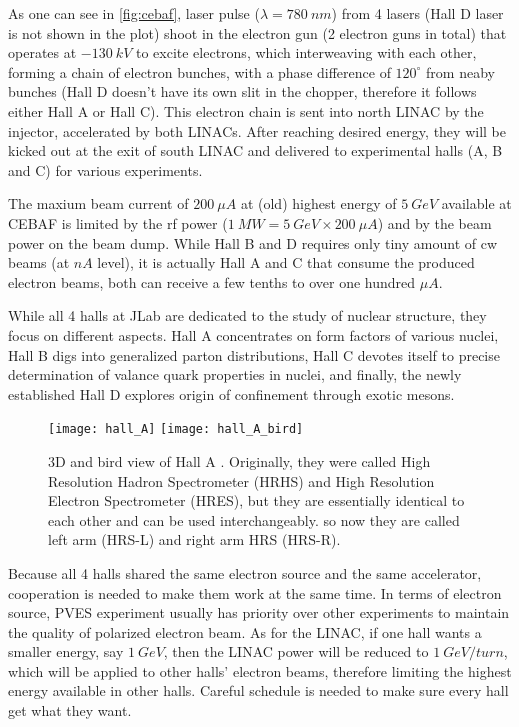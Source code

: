 As one can see in \ref{fig:cebaf}, laser pulse ($\lambda = 780 \ nm$) from 4 lasers 
(Hall D laser is not shown in the plot) shoot in the electron gun 
(2 electron guns in total) that 
operates at $-130\ kV$ to excite electrons, which interweaving with each other, 
forming a chain of electron bunches, with a phase difference of $120^\circ$ from 
neaby bunches (Hall D doesn't have its own slit in the chopper, therefore 
it follows either Hall A or Hall C). This electron chain is sent into north LINAC
by the injector, accelerated by both LINACs. After reaching desired energy,
they will be kicked out at the exit of south LINAC and delivered to experimental
halls (A, B and C) for various experiments. 

The maxium beam current of $200\ \mu A$ at (old) highest energy of $5\ GeV$ 
available at CEBAF is limited by the rf power ($1\ MW = 5\ GeV \times 200\ \mu A$) 
and by the beam power on the beam dump. While Hall B and D requires only tiny 
amount of cw beams (at $nA$ level), it is actually Hall A and C that consume 
the produced electron beams, both can receive a few tenths to over one 
hundred $\mu A$.

While all 4 halls at JLab are dedicated to the study of nuclear structure, they
focus on different aspects. Hall A concentrates on form factors of various nuclei, 
Hall B digs into generalized parton distributions, Hall C devotes itself to precise
determination of valance quark properties in nuclei, and finally, the newly 
established Hall D explores origin of confinement through exotic mesons.
\begin{figure}[h!]
    \centering
    \texttt{[image: hall\_A]}
    \texttt{[image: hall\_A\_bird]}
    \caption{3D and bird view of Hall A \cite{halla_manual}. Originally, they
    were called High Resolution Hadron Spectrometer (HRHS) and High Resolution Electron
    Spectrometer (HRES), but they are essentially identical to each other and
    can be used interchangeably.
    so now they are called left arm (HRS-L) and right arm HRS (HRS-R).
    }
\end{figure}

Because all 4 halls shared the same electron source and the same accelerator, 
cooperation is needed to make them work at the same time. In terms of electron
source, PVES experiment usually has priority over other experiments to maintain 
the quality of polarized electron beam. As for the LINAC, if one hall wants
a smaller energy, say $1\ GeV$, then the LINAC power will be reduced to $1\ GeV/turn$,
which will be applied to other halls' electron beams, therefore limiting the 
highest energy available in other halls. Careful schedule is needed to make sure
every hall get what they want.
